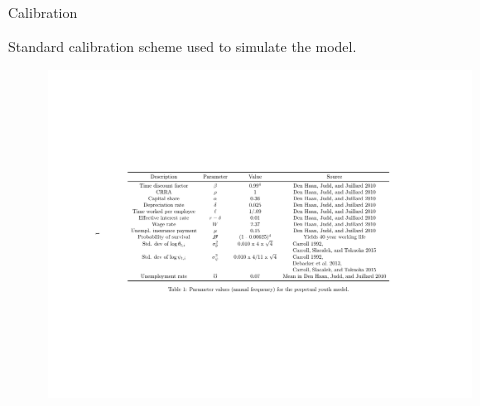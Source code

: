 \documentclass{beamer}
\begin{document}
\begin{frame}{Calibration}

Standard calibration scheme used to simulate the model.

  \vfill
   \begin{figure}
    \centering
    \includegraphics[width=.85\linewidth]{Tables/calibrationPY.pdf}
  \end{figure}
  \vfill

\end{frame}
\end{document}
